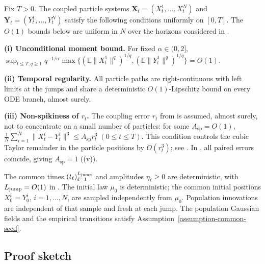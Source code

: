 \begin{assumption}
\label{assumption-main-coupled-particle-regularity}
Fix \(T>0\). The coupled particle systems
\(\mathbf X_t=(X_t^1,\dots,X_t^N)\) and
\(\mathbf Y_t=(Y_t^1,\dots,Y_t^N)\) satisfy the following conditions uniformly
on \([0,T]\). The \(O(1)\) bounds below are uniform in \(N\) over the
horizons considered in .

\begingroup\raggedright
\noindent
\textbf{(i) Unconditional moment bound.}
For fixed $\alpha\in(0,2]$,
\(\sup_{t\le T,q\ge1}q^{-1/\alpha}
\max\{(\mathbb E\|X_t^1\|^q)^{1/q},
       (\mathbb E\|Y_t^1\|^q)^{1/q}\}=O(1)\).\par
\endgroup

\noindent
\textbf{(ii) Temporal regularity.}
All particle paths are right-continuous with left limits at the jumps and
share a deterministic \(O(1)\)-Lipschitz bound on every ODE branch, almost surely.

\noindent
\textbf{(iii) Non-spikiness of $r_t$.}
The coupling error \(r_t\) from  is assumed,
almost surely, not to concentrate on a small number of particles: for some
\(A_{\mathrm{sp}} = O(1)\),
\(\frac1N\sum_{i=1}^N\|X_t^i-Y_t^i\|^3 \le A_{\mathrm{sp}} r_t^3\;
    (0\le t\le T)\).
This condition controls the cubic Taylor remainder in the particle positions by \(O(r_t^3)\);
see .
In , all paired errors coincide, giving
\(A_{\mathrm{sp}}=1\) ((v)).
\end{assumption}

\begin{assumption}
\label{assumption-main-jump-time}
The common times $(t_\ell)_{\ell=1}^{L_{\mathrm{jump}}}$ and amplitudes $\eta_\ell\ge0$
are deterministic, with $L_{\mathrm{jump}}=O(1)$ in .
The initial law \(\mu_0\) is deterministic; the common initial positions
\(X_0^i=Y_0^i\), \(i=1,\ldots,N\), are sampled independently from \(\mu_0\).
Population innovations are independent of that sample and fresh at each
jump. The population Gaussian fields and the empirical transitions satisfy
Assumption~\ref{assumption-common-seed}.
\end{assumption}

\subsection{Proof sketch}
\label{subsec:proof-sketch-after-assumptions}

